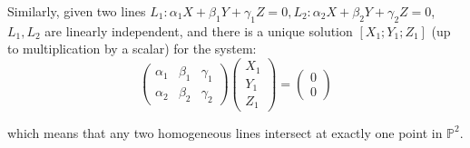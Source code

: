 \documentclass{article}
\begin{document}
Similarly, given two lines $L_1: \alpha_1 X + \beta_1 Y + \gamma_1 Z = 0,
L_2: \alpha_2 X + \beta_2 Y + \gamma_2 Z = 0$, $L_1, L_2$ are linearly independent, and
there is a unique solution $[X_1; Y_1; Z_1]$ (up to multiplication by a scalar) for the system:
\[
\begin{pmatrix}
\alpha_1 & \beta_1 & \gamma_1 \\
\alpha_2 & \beta_2 & \gamma_2
\end{pmatrix} \begin{pmatrix}
X_1 \\ Y_1 \\ Z_1
\end{pmatrix} = \begin{pmatrix}
0 \\ 0
\end{pmatrix}
\]

which means that any two homogeneous lines intersect at exactly one point in $\mathbb{P}^2$.
\end{document}
